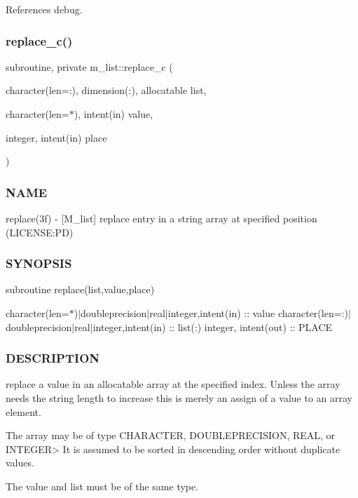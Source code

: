 References debug.

\mbox{\label{namespacem__list_adddd2b7443557b3727320c314170e001}} 
\subsubsection{\texorpdfstring{replace\+\_\+c()}{replace\_c()}}
{\footnotesize\ttfamily subroutine, private m\+\_\+list\+::replace\+\_\+c (\begin{DoxyParamCaption}\item[{character(len=\+:), dimension(\+:), allocatable}]{list,  }\item[{character(len=$\ast$), intent(in)}]{value,  }\item[{integer, intent(in)}]{place }\end{DoxyParamCaption})\hspace{0.3cm}{\ttfamily [private]}}



\subsubsection*{N\+A\+ME}

replace(3f) -\/ \mbox{[}M\+\_\+list\mbox{]} replace entry in a string array at specified position (L\+I\+C\+E\+N\+SE\+:PD) 

\subsubsection*{S\+Y\+N\+O\+P\+S\+IS}

subroutine replace(list,value,place)

character(len=$\ast$)$\vert$doubleprecision$\vert$real$\vert$integer,intent(in) \+:\+: value character(len=\+:)$\vert$doubleprecision$\vert$real$\vert$integer,intent(in) \+:\+: list(\+:) integer, intent(out) \+:\+: P\+L\+A\+CE

\subsubsection*{D\+E\+S\+C\+R\+I\+P\+T\+I\+ON}

\begin{DoxyVerb}replace a value in an allocatable array at the specified index. Unless the
array needs the string length to increase this is merely an assign of a value
to an array element.

The array may be of type CHARACTER, DOUBLEPRECISION, REAL, or INTEGER>
It is assumed to be sorted in descending order without duplicate values.

The value and list must be of the same type.
\end{DoxyVerb}


